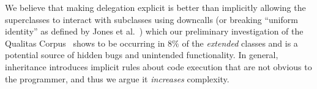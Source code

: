 \documentclass[preprint]{sigplanconf}
\begin{document}
We believe that making delegation explicit is better than implicitly
allowing the superclasses to interact with subclasses using downcalls (or breaking ``uniform identity'' as defined by Jones et al.~\cite{jones:2016:inheritance}) which our preliminary investigation of the Qualitas Corpus~\cite{QualitasCorpus:APSEC:2010} shows to be occurring in $8\%$ of the \textit{extended} classes and is a potential source of hidden bugs and unintended functionality. In general, inheritance introduces implicit rules about code execution that are not obvious to the programmer, and thus we argue it \textit{increases} complexity.






\end{document}
